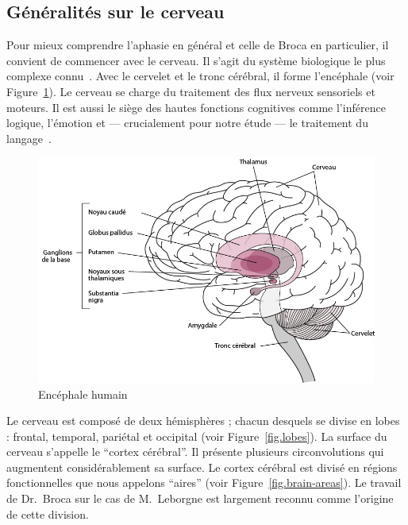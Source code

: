 \subsection{Généralités sur le cerveau}

Pour mieux comprendre l'aphasie en général et celle de Broca en particulier, 
il convient de commencer avec le cerveau.
Il s'agit du système biologique le plus complexe connu~\cite{}.
Avec le cervelet et le tronc cérébral, il forme l'encéphale (voir Figure~\ref{fig.brain}).
Le cerveau se charge du traitement des flux nerveux sensoriels et moteurs.
Il est aussi le siège des hautes fonctions cognitives comme l'inférence logique, l'émotion 
et --- crucialement pour notre étude --- le traitement du langage~\cite{}.

\begin{figure}[htb]
    \begin{center}
        \includegraphics[width=.8\textwidth]{assets/images/brain.png}
    \end{center}
    \caption{Encéphale humain}
    \label{fig.brain}
\end{figure}

Le cerveau est composé de deux hémisphères ; chacun desquels se divise en lobes : 
frontal, temporal, pariétal et occipital (voir Figure~\ref{fig.lobes}).
La surface du cerveau s'appelle le ``cortex cérébral''.
Il présente plusieurs circonvolutions qui augmentent considérablement sa surface.
Le cortex cérébral est divisé en régions fonctionnelles que nous appelons ``aires''
(voir Figure~\ref{fig.brain-areas}).
Le travail de Dr.~Broca sur le cas de M.~Leborgne est largement reconnu comme l'origine de cette division.


